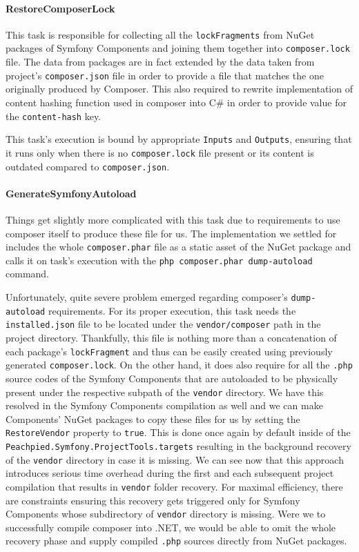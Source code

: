 \paragraph{RestoreComposerLock} This task is responsible for collecting all the \texttt{lockFragments} from NuGet packages of Symfony Components and joining them together into \texttt{composer.lock} file. The data from packages are in fact extended by the data taken from project's \texttt{composer.json} file in order to provide a file that matches the one originally produced by Composer. This also required to rewrite implementation of content hashing function used in composer into C\# in order to provide value for the \texttt{content-hash} key.

This task's execution is bound by appropriate \texttt{Inputs} and \texttt{Outputs}, ensuring that it runs only when there is no \texttt{composer.lock} file present or its content is outdated compared to \texttt{composer.json}.

\paragraph{GenerateSymfonyAutoload} Things get slightly more complicated with this task due to requirements to use composer itself to produce these file for us. The implementation we settled for includes the whole \texttt{composer.phar} file as a static asset of the NuGet package and calls it on task's execution with the \texttt{php composer.phar dump-autoload} command.

Unfortunately, quite severe problem emerged regarding composer's \texttt{dump-autoload} requirements. For its proper execution, this task needs the \texttt{installed.json} file to be located under the \texttt{vendor/composer} path in the project directory. Thankfully, this file is nothing more than a concatenation of each package's \texttt{lockFragment} and thus can be easily created using previously generated \texttt{composer.lock}. On the other hand, it does also require for all the \texttt{.php} source codes of the Symfony Components that are autoloaded to be physically present under the respective subpath of the \texttt{vendor} directory. We have this resolved in the Symfony Components compilation as well and we can make Components' NuGet packages to copy these files for us by setting the \texttt{RestoreVendor} property to \texttt{true}. This is done once again by default inside of the \texttt{Peachpied.Symfony.ProjectTools.targets} resulting in the background recovery of the \texttt{vendor} directory in case it is missing. We can see now that this approach introduces serious time overhead during the first and each subsequent project compilation that results in \texttt{vendor} folder recovery. For maximal efficiency, there are constraints ensuring this recovery gets triggered only for Symfony Components whose subdirectory of \texttt{vendor} directory is missing. Were we to successfully compile composer into .NET, we would be able to omit the whole recovery phase and supply compiled \texttt{.php} sources directly from NuGet packages.

